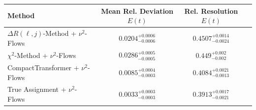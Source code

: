     \begin{tabular}{lccc}
        \toprule
        Method & Mean Rel. Deviation $E(t)$ & Rel. Resolution $E(t)$ \\
        \midrule
        $\Delta R(\ell,j)$-Method + $\nu^2$-Flows & $0.0204^{+0.0006}_{-0.0006}$ & $0.4507^{+0.0014}_{-0.0024}$ \\
        $\chi^2$-Method + $\nu^2$-Flows & $0.0286^{+0.0005}_{-0.0005}$ & $0.449^{+0.002}_{-0.002}$ \\
        CompactTransformer + $\nu^2$-Flows & $0.0085^{+0.0004}_{-0.0003}$ & $0.4084^{+0.0021}_{-0.0013}$ \\
        True Assignment + $\nu^2$-Flows & $0.0033^{+0.0003}_{-0.0003}$ & $0.3913^{+0.0017}_{-0.0021}$ \\
        \bottomrule
    \end{tabular}